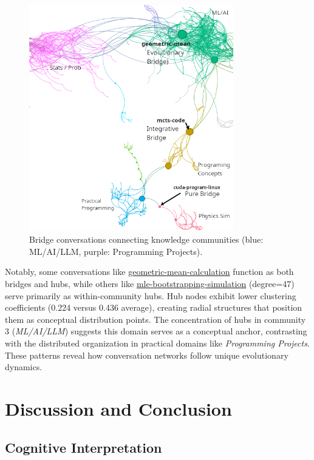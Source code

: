 \documentclass{svproc}
\begin{document}
\begin{figure}[!h] %
\centering
\includegraphics[width=3.5in]{./images/bridge-better.png}
\caption{Bridge conversations connecting knowledge communities (blue: ML/AI/LLM, purple: Programming Projects).}
\label{fig:bridge_zoom}
\end{figure}

Notably, some conversations like \url{geometric-mean-calculation} function as both bridges and hubs, while others like \url{mle-bootstrapping-simulation} (degree=47) serve primarily as within-community hubs. Hub nodes exhibit lower clustering coefficients (0.224 versus 0.436 average), creating radial structures that position them as conceptual distribution points. The concentration of hubs in community 3 (\emph{ML/AI/LLM}) suggests this domain serves as a conceptual anchor, contrasting with the distributed organization in practical domains like \emph{Programming Projects}. These patterns reveal how conversation networks follow unique evolutionary dynamics.

\section{Discussion and Conclusion}

\subsection{Cognitive Interpretation}
\end{document}
